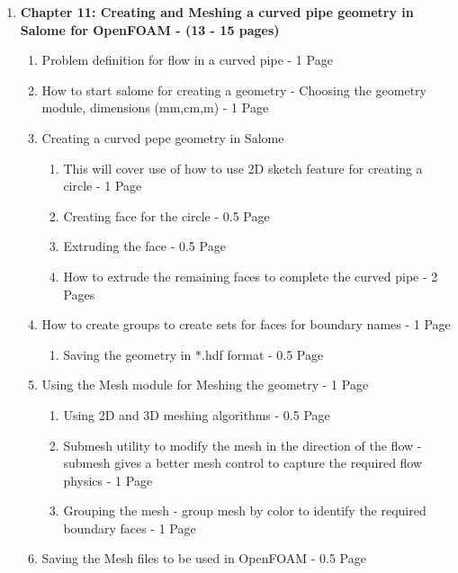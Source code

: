 \documentclass[12pt]{article}
\begin{document}
\begin{enumerate}
\item \textbf{Chapter 11: Creating and Meshing a curved pipe geometry in Salome for OpenFOAM - (13 - 15 pages)}
\begin{enumerate}[label*=\arabic*.]
\item Problem definition for flow in a curved pipe - 1 Page
\item How to start salome for creating a geometry - Choosing the geometry module, dimensions (mm,cm,m) - 1 Page
\item Creating a curved pepe geometry in Salome
\begin{enumerate}[label*=\arabic*.]
\item This will cover use of how to use 2D sketch feature for creating a circle - 1 Page
\item Creating face for the circle - 0.5 Page
\item Extruding the face - 0.5 Page
\item How to extrude the remaining faces to complete the curved pipe - 2 Pages 
\end{enumerate}
\item How to create groups to create sets for faces for boundary names - 1 Page
\begin{enumerate}[label*=\arabic*.]
\item Saving the geometry in $*$.hdf format - 0.5 Page
\end{enumerate}
\item Using the Mesh module for Meshing the geometry - 1 Page
\begin{enumerate}[label*=\arabic*.]
\item Using 2D and 3D meshing algorithms - 0.5 Page
\item Submesh utility to modify the mesh in the direction of the flow - submesh gives a better mesh control to capture the required flow physics - 1 Page
\item Grouping the mesh - group mesh by color to identify the required boundary faces -  1 Page
\end{enumerate}
\item Saving the Mesh files to be used in OpenFOAM - 0.5 Page
\end{enumerate}


\end{enumerate}
\end{document}
